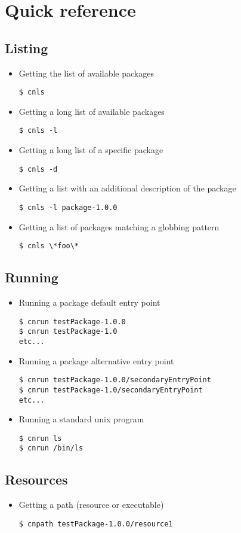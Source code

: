 \section{Quick reference}

\subsection{Listing}

\begin{itemize}
\item Getting the list of available packages
\begin{verbatim}
$ cnls
\end{verbatim}
\item Getting a long list of available packages
\begin{verbatim}
$ cnls -l
\end{verbatim}
\item Getting a long list of a specific package
\begin{verbatim}
$ cnls -d
\end{verbatim}
\item Getting a list with an additional description of the package
\begin{verbatim}
$ cnls -l package-1.0.0
\end{verbatim}
\item Getting a list of packages matching a globbing pattern
\begin{verbatim}
$ cnls \*foo\*
\end{verbatim}
\end{itemize}

\subsection{Running}

\begin{itemize}
\item Running a package default entry point
\begin{verbatim}
$ cnrun testPackage-1.0.0
$ cnrun testPackage-1.0
etc...
\end{verbatim}
\item Running a package alternative entry point
\begin{verbatim}
$ cnrun testPackage-1.0.0/secondaryEntryPoint
$ cnrun testPackage-1.0/secondaryEntryPoint
etc...
\end{verbatim}
\item Running a standard unix program 
\begin{verbatim}
$ cnrun ls
$ cnrun /bin/ls
\end{verbatim}
\end{itemize}

\subsection{Resources}

\begin{itemize}
\item Getting a path (resource or executable)
\begin{verbatim}
$ cnpath testPackage-1.0.0/resource1
\end{verbatim}
\end{itemize}
